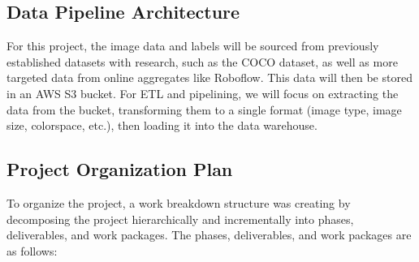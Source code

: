 \documentclass[stu,12pt,floatsintext]{apa7}
\begin{document}
\subsection{Data Pipeline Architecture}

For this project, the image data and labels will be sourced from previously established datasets with research, such as the COCO dataset, as well as more targeted data from online aggregates like Roboflow. This data will then be stored in an AWS S3 bucket. For ETL and pipelining, we will focus on extracting the data from the bucket, transforming them to a single format (image type, image size, colorspace, etc.), then loading it into the data warehouse.

\subsection{Project Organization Plan}
To organize the project, a work breakdown structure was creating by decomposing the project hierarchically and incrementally into phases, deliverables, and work packages. The phases, deliverables, and work packages are as follows:
\end{document}
